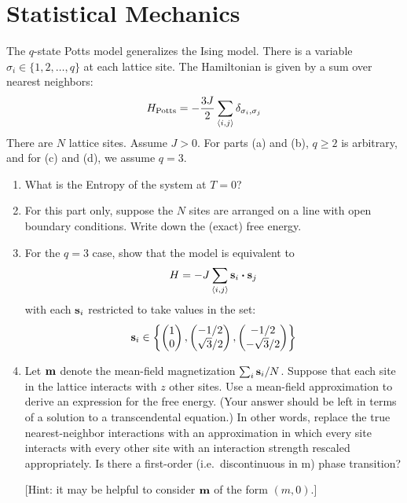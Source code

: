 \section{Statistical Mechanics}
\begin{problem}
  The $q$-state Potts model generalizes the Ising model. There is a variable $\sigma_i\in\{1,2,\ldots,q\}$ at each lattice site. The Hamiltonian is given by a sum over nearest neighbors:
  \begin{align*}
    H_{\text{Potts}}=-\frac{3J}{2}\sum_{\ev{i,j}}\delta_{\sigma_i,\sigma_j}
  \end{align*}
  There are $N$ lattice sites. Assume $J>0$. For parts (a) and (b), $q\geq2$ is arbitrary, and for (c) and (d), we assume $q=3$.
  \begin{enumerate}[label=(\alph*)]
  \item What is the Entropy of the system at $T=0$?
  \item For this part only, suppose the $N$ sites are arranged on a line with open boundary conditions. Write down the (exact) free energy.
  \item For the $q = 3$ case, show that the model is equivalent to
    \begin{align*}
      H=-J\sum_{\ev{i,j}}\vb{s}_i\vdot\vb{s}_j
    \end{align*}
    with each $\vb{s}_i$ restricted to take values in the set:
    \begin{align*}
      \vb{s}_i\in\qty{
        \pmqty{1\\0},
        \pmqty{-1/2\\\sqrt{3}/2},
        \pmqty{-1/2\\-\sqrt{3}/2}}
    \end{align*}
  \item Let $\vb{m}$ denote the mean-field magnetization $\sum_i\vb{s}_i/N$. Suppose that each site in the lattice interacts with $z$ other sites. Use a mean-field approximation to derive an expression for the free energy. (Your answer should be left in terms of a solution to a transcendental equation.) In other words, replace the true nearest-neighbor interactions with an approximation in which every site interacts with every other site with an interaction strength rescaled appropriately. Is there a first-order (i.e.\ discontinuous in m) phase transition?

    [Hint: it may be helpful to consider $\vb{m}$ of the form $(m, 0)$.]
  \end{enumerate}
\end{problem}
